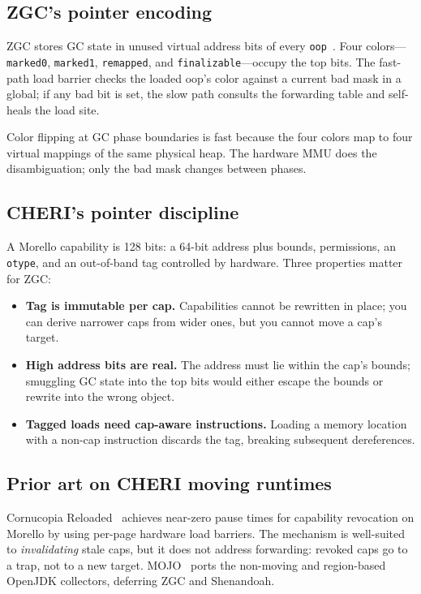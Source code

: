 \documentclass[acmsmall,nonacm]{acmart}
\begin{document}
\subsection{ZGC's pointer encoding}

ZGC stores GC state in unused virtual address bits of every
\texttt{oop}~\cite{zgc-toplas}. Four colors—\texttt{marked0},
\texttt{marked1}, \texttt{remapped}, and \texttt{finalizable}—occupy
the top bits. The fast-path load barrier checks the loaded oop's color
against a current bad mask in a global; if any bad bit is set, the
slow path consults the forwarding table and self-heals the load site.

Color flipping at GC phase boundaries is fast because the four colors
map to four virtual mappings of the same physical heap. The hardware
MMU does the disambiguation; only the bad mask changes between phases.

\subsection{CHERI's pointer discipline}

A Morello capability is 128 bits: a 64-bit address plus bounds,
permissions, an \texttt{otype}, and an out-of-band tag controlled by
hardware. Three properties matter for ZGC:

\begin{itemize}
\item \textbf{Tag is immutable per cap.} Capabilities cannot be rewritten
      in place; you can derive narrower caps from wider ones, but you
      cannot move a cap's target.
\item \textbf{High address bits are real.} The address must lie within
      the cap's bounds; smuggling GC state into the top bits would
      either escape the bounds or rewrite into the wrong object.
\item \textbf{Tagged loads need cap-aware instructions.} Loading a
      memory location with a non-cap instruction discards the tag,
      breaking subsequent dereferences.
\end{itemize}

\subsection{Prior art on CHERI moving runtimes}

Cornucopia Reloaded~\cite{cornucopia-reloaded} achieves near-zero pause
times for capability revocation on Morello by using per-page hardware
load barriers. The mechanism is well-suited to \emph{invalidating}
stale caps, but it does not address forwarding: revoked caps go to a
trap, not to a new target. MOJO~\cite{mojo-jvm} ports the non-moving
and region-based OpenJDK collectors, deferring ZGC and Shenandoah.
\end{document}
